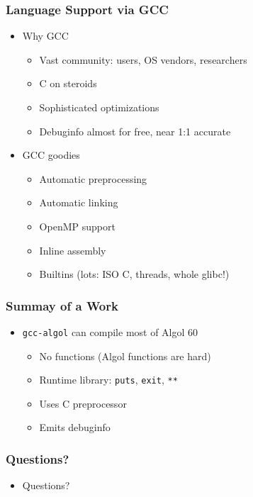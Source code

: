 \documentclass[14pt]{beamer}
\begin{document}
\frame
{
  \frametitle{Language Support via GCC}

  \begin{itemize}
  \item Why GCC
    \begin{itemize}
    \item Vast community: users, OS vendors, researchers
    \item C on steroids
    \item Sophisticated optimizations
    \item Debuginfo almost for free, near 1:1 accurate
    \end{itemize}

  \item GCC goodies
    \begin{itemize}
    \item Automatic preprocessing
    \item Automatic linking
    \item OpenMP support
    \item Inline assembly
    \item Builtins (lots: ISO C, threads, whole glibc!)
    \end{itemize}
  \end{itemize}
}

\frame
{
  \frametitle{Summay of a Work}

  \begin{itemize}
  \item {\tt gcc-algol} can compile most of Algol 60
    \begin{itemize}
    \item No functions (Algol functions are hard)
    \item Runtime library: \texttt{puts}, \texttt{exit}, \texttt{**}
    \item Uses C preprocessor
    \item Emits debuginfo
    \end{itemize}
  \end{itemize}
}


\frame
{
  \frametitle{Questions?}

  \begin{itemize}
  \item Questions?
  \end{itemize}
}
\end{document}
